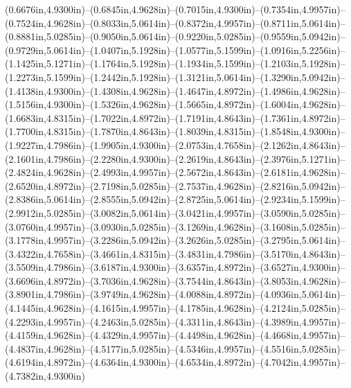 (0.6676in,4.9300in)--(0.6845in,4.9628in)--(0.7015in,4.9300in)--(0.7354in,4.9957in)--(0.7524in,4.9628in)--(0.8033in,5.0614in)--(0.8372in,4.9957in)--(0.8711in,5.0614in)--(0.8881in,5.0285in)--(0.9050in,5.0614in)--(0.9220in,5.0285in)--(0.9559in,5.0942in)--(0.9729in,5.0614in)--(1.0407in,5.1928in)--(1.0577in,5.1599in)--(1.0916in,5.2256in)--(1.1425in,5.1271in)--(1.1764in,5.1928in)--(1.1934in,5.1599in)--(1.2103in,5.1928in)--(1.2273in,5.1599in)--(1.2442in,5.1928in)--(1.3121in,5.0614in)--(1.3290in,5.0942in)--(1.4138in,4.9300in)--(1.4308in,4.9628in)--(1.4647in,4.8972in)--(1.4986in,4.9628in)--(1.5156in,4.9300in)--(1.5326in,4.9628in)--(1.5665in,4.8972in)--(1.6004in,4.9628in)--(1.6683in,4.8315in)--(1.7022in,4.8972in)--(1.7191in,4.8643in)--(1.7361in,4.8972in)--(1.7700in,4.8315in)--(1.7870in,4.8643in)--(1.8039in,4.8315in)--(1.8548in,4.9300in)--(1.9227in,4.7986in)--(1.9905in,4.9300in)--(2.0753in,4.7658in)--(2.1262in,4.8643in)--(2.1601in,4.7986in)--(2.2280in,4.9300in)--(2.2619in,4.8643in)--(2.3976in,5.1271in)--(2.4824in,4.9628in)--(2.4993in,4.9957in)--(2.5672in,4.8643in)--(2.6181in,4.9628in)--(2.6520in,4.8972in)--(2.7198in,5.0285in)--(2.7537in,4.9628in)--(2.8216in,5.0942in)--(2.8386in,5.0614in)--(2.8555in,5.0942in)--(2.8725in,5.0614in)--(2.9234in,5.1599in)--(2.9912in,5.0285in)--(3.0082in,5.0614in)--(3.0421in,4.9957in)--(3.0590in,5.0285in)--(3.0760in,4.9957in)--(3.0930in,5.0285in)--(3.1269in,4.9628in)--(3.1608in,5.0285in)--(3.1778in,4.9957in)--(3.2286in,5.0942in)--(3.2626in,5.0285in)--(3.2795in,5.0614in)--(3.4322in,4.7658in)--(3.4661in,4.8315in)--(3.4831in,4.7986in)--(3.5170in,4.8643in)--(3.5509in,4.7986in)--(3.6187in,4.9300in)--(3.6357in,4.8972in)--(3.6527in,4.9300in)--(3.6696in,4.8972in)--(3.7036in,4.9628in)--(3.7544in,4.8643in)--(3.8053in,4.9628in)--(3.8901in,4.7986in)--(3.9749in,4.9628in)--(4.0088in,4.8972in)--(4.0936in,5.0614in)--(4.1445in,4.9628in)--(4.1615in,4.9957in)--(4.1785in,4.9628in)--(4.2124in,5.0285in)--(4.2293in,4.9957in)--(4.2463in,5.0285in)--(4.3311in,4.8643in)--(4.3989in,4.9957in)--(4.4159in,4.9628in)--(4.4329in,4.9957in)--(4.4498in,4.9628in)--(4.4668in,4.9957in)--(4.4837in,4.9628in)--(4.5177in,5.0285in)--(4.5346in,4.9957in)--(4.5516in,5.0285in)--(4.6194in,4.8972in)--(4.6364in,4.9300in)--(4.6534in,4.8972in)--(4.7042in,4.9957in)--(4.7382in,4.9300in)
